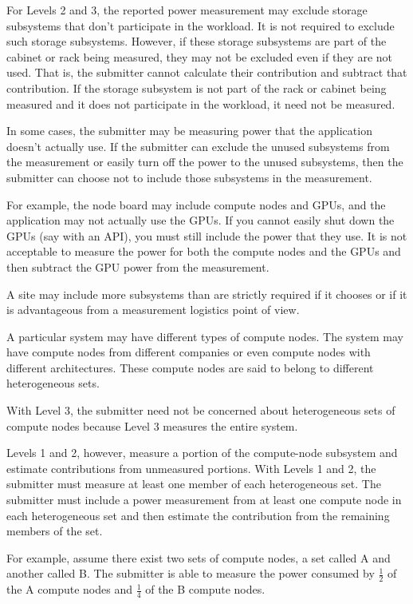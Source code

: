 \noindent
For Levels 2 and 3, the reported power measurement may exclude storage subsystems that don't participate in the workload. It is not required to exclude such storage subsystems. However, if these storage subsystems are part of the cabinet or rack being measured, they may not be excluded even if they are not used. That is, the submitter cannot calculate their contribution and subtract that contribution. If the storage subsystem is not part of the rack or cabinet being measured and it does not participate in the workload, it need not be measured.
\wl

\noindent
In some cases, the submitter may be measuring power that the application doesn't actually use. If the submitter can exclude the unused subsystems from the measurement or easily turn off the power to the unused subsystems, then the submitter can choose not to include those subsystems in the measurement. 
\wl

\noindent
For example, the node board may include compute nodes and GPUs, and the application may not actually use the GPUs.  If you cannot easily shut down the GPUs (say with an API), you must still include the power that they use. It is not acceptable to measure the power for both the compute nodes and the GPUs and then subtract the GPU power from the measurement.
\wl

\noindent
A site may include more subsystems than are strictly required if it chooses or if it is advantageous from a measurement logistics point of view.  
\wl

\noindent
A particular system may have different types of compute nodes. The system may have compute nodes from different companies or even compute nodes with different architectures. These compute nodes are said to belong to different heterogeneous sets.
\wl

\noindent
With Level 3, the submitter need not be concerned about heterogeneous sets of compute nodes because Level 3 measures the entire system. 
\wl

\noindent
Levels 1 and 2, however, measure a portion of the compute-node subsystem and estimate contributions from unmeasured portions. With Levels 1 and 2, the submitter must measure at least one member of each heterogeneous set. The submitter must include a power measurement from at least one compute node in each heterogeneous set and then estimate the contribution from the remaining members of the set. 
\wl

\noindent
For example, assume there exist two sets of compute nodes, a set called A and another called B.  The submitter is able to measure the power 
consumed by $ \frac{1}{2} $ of the A compute nodes and $ \frac{1}{4} $ of the B compute nodes.
\wl

